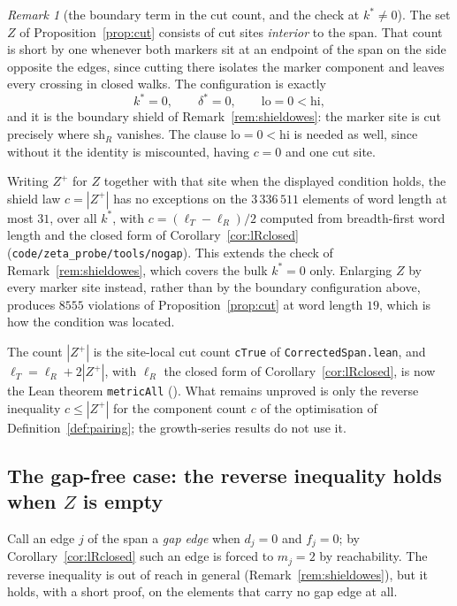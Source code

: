 \documentclass[11pt]{article}
\theoremstyle{plain}
\theoremstyle{definition}
\theoremstyle{remark}
\newtheorem{remark}[theorem]{Remark}
\begin{document}
\begin{remark}[the boundary term in the cut count, and the check at $k^\ast\ne0$]\label{rem:boundaryterm}
The set $Z$ of Proposition~\ref{prop:cut} consists of cut sites \emph{interior} to the span. That
count is short by one whenever both markers sit at an endpoint of the span on the side opposite the
edges, since cutting there isolates the marker component and leaves every crossing in closed walks.
The configuration is exactly
\[
   k^\ast=0,\qquad \delta^\ast=0,\qquad \mathrm{lo}=0<\mathrm{hi},
\]
and it is the boundary shield of Remark~\ref{rem:shieldowes}: the marker site is cut precisely where
$\mathrm{sh}_R$ vanishes. The clause $\mathrm{lo}=0<\mathrm{hi}$ is needed as well, since without it
the identity is miscounted, having $c=0$ and one cut site.

Writing $Z^{+}$ for $Z$ together with that site when the displayed condition holds, the shield law
$c=|Z^{+}|$ has no exceptions on the $3\,336\,511$ elements of word length at most $31$, over all
$k^\ast$, with $c=(\ell_T-\ell_R)/2$ computed from breadth-first word length and the closed form of
Corollary~\ref{cor:lRclosed} (\texttt{code/zeta\_probe/tools/nogap}). This extends the check of
Remark~\ref{rem:shieldowes}, which covers the bulk $k^\ast=0$ only. Enlarging $Z$ by every marker
site instead, rather than by the boundary configuration above, produces $8555$ violations of
Proposition~\ref{prop:cut} at word length $19$, which is how the condition was located.

The count $|Z^{+}|$ is the site-local cut count \texttt{cTrue} of \texttt{CorrectedSpan.lean}, and
$\ell_T=\ell_R+2|Z^{+}|$, with $\ell_R$ the closed form of Corollary~\ref{cor:lRclosed}, is now the
Lean theorem \texttt{metricAll} ({\cite[Theorem ``the transfer model \textup{(M)}'', \textup{thm:model}]{Bonfioli2026bA}}). What remains unproved is only the
reverse inequality $c\le|Z^{+}|$ for the component count $c$ of the optimisation of
Definition~\ref{def:pairing}; the growth-series results do not use it.
\end{remark}

\subsection{The gap-free case: the reverse inequality holds when $Z$ is empty}\label{ss:nogap}

Call an edge $j$ of the span a \emph{gap edge} when $d_j=0$ and $f_j=0$; by
Corollary~\ref{cor:lRclosed} such an edge is forced to $m_j=2$ by reachability. The reverse
inequality is out of reach in general (Remark~\ref{rem:shieldowes}), but it holds, with a short
proof, on the elements that carry no gap edge at all.
\end{document}
